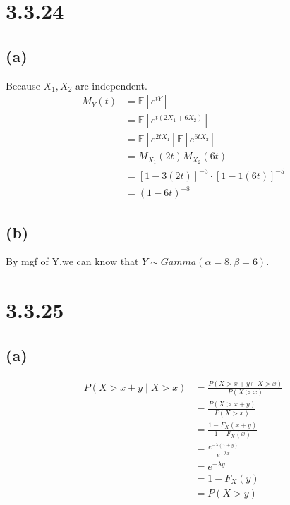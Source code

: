 \documentclass{article}
\begin{document}
\section*{3.3.24}
\subsection*{(a)}
Because \(X_1,X_2\) are independent.
\begin{align*}
M_Y(t)&=\mathbb{E}[e^{tY}]\\
&=\mathbb{E}[e^{t(2X_1+6X_2)}]\\
&=\mathbb{E}[e^{2tX_1}]\mathbb{E}[e^{6tX_2}]\\
&=M_{X_1}(2t)M_{X_2}(6t)\\
&=[1-3(2t)]^{-3} \cdot [1-1(6t)]^{-5}\\
&=(1-6t)^{-8}
\end{align*}
\subsection*{(b)}
By mgf of Y,we can know that \(Y \sim Gamma(\alpha = 8,\beta = 6)\).
\section*{3.3.25}
\subsection*{(a)}
\begin{align*}
P(X>x+y \mid X>x)&=\frac{P(X > x+y \cap X>x)}{P(X>x)}\\
&=\frac{P(X > x+y)}{P(X>x)}\\
&=\frac{1-F_X(x+y)}{1-F_X(x)}\\
&=\frac{e^{-\lambda(x+y)}}{e^{-\lambda x}}\\
&=e^{-\lambda y}\\
&=1-F_X(y)\\
&=P(X>y)
\end{align*}
\end{document}
